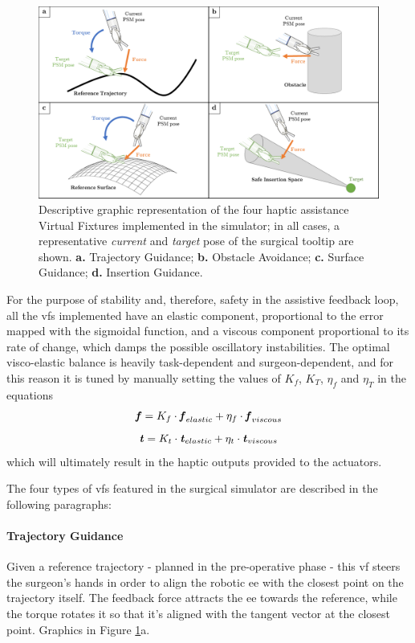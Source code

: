 \documentclass{article}
\newcommand{\vect}[1]{\textbf{\textit{#1}}}
\begin{document}
\begin{multicols}{2}
\begin{figure}
  \centering
      \includegraphics[width=\linewidth]{images/vfs_graphics.png}
      \caption{Descriptive graphic representation of the four haptic assistance Virtual Fixtures implemented in the simulator; in all cases, a representative \textit{current} and \textit{target} pose of the surgical tooltip are shown. \textbf{a.} Trajectory Guidance; \textbf{b.} Obstacle Avoidance; \textbf{c.} Surface Guidance; \textbf{d.} Insertion Guidance.}
      \label{fig:vfs_scheme}
\end{figure}

For the purpose of stability and, therefore, safety in the assistive feedback loop, all the \acp{vf} implemented have an elastic component, proportional to the error mapped with the sigmoidal function, and a viscous component proportional to its rate of change, which damps the possible oscillatory instabilities. The optimal visco-elastic balance is heavily task-dependent and surgeon-dependent, and for this reason it is tuned by manually setting the values of $K_f$, $K_T$, $\eta_f$ and $\eta_T$ in the equations
\begin{equation}
  \vect{f} = K_f\cdot\vect{f}_{elastic} + \eta_f\cdot\vect{f}_{viscous} 
  \label{eq:forcevfbalance}
\end{equation}
\begin{equation}
  \vect{t} = K_t\cdot\vect{t}_{elastic} + \eta_t\cdot\vect{t}_{viscous} 
  \label{eq:torquevfbalance}
\end{equation}    
which will ultimately result in the haptic outputs provided to the actuators.

The four types of \acp{vf} featured in the surgical simulator are described in the following paragraphs:
\paragraph{Trajectory Guidance} Given a reference trajectory - planned in the pre-operative phase - this \ac{vf} steers the surgeon's hands in order to align the robotic \ac{ee} with the closest point on the trajectory itself. The feedback force attracts the \ac{ee} towards the reference, while the torque rotates it so that it's aligned with the tangent vector at the closest point. Graphics in Figure \ref{fig:vfs_scheme}a.

\end{multicols}
\end{document}
